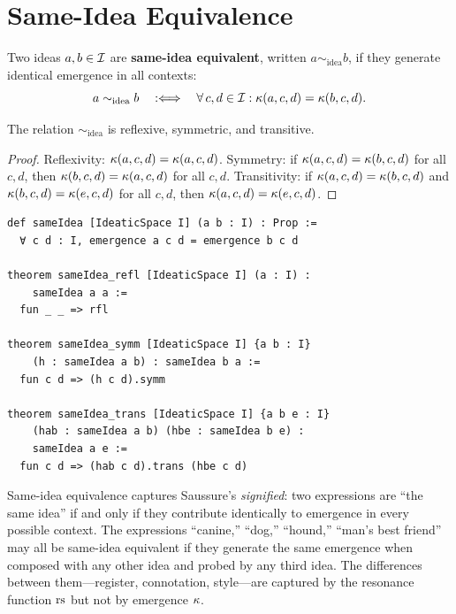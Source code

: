 \section{Same-Idea Equivalence}

\begin{definition}\label{def:same-idea}
Two ideas $a, b \in \mathcal{I}$ are \textbf{same-idea equivalent}, written
$a \sim_{\mathrm{idea}} b$, if they generate identical emergence in all
contexts:
\[
    a \sim_{\mathrm{idea}} b \quad :\Longleftrightarrow \quad
    \forall\, c, d \in \mathcal{I} : \kappa(a, c, d) = \kappa(b, c, d).
\]
\end{definition}

\begin{proposition}
The relation $\sim_{\mathrm{idea}}$ is reflexive, symmetric, and
transitive.
\end{proposition}
\begin{proof}
Reflexivity: $\kappa(a,c,d) = \kappa(a,c,d)$. Symmetry: if
$\kappa(a,c,d) = \kappa(b,c,d)$ for all $c,d$, then
$\kappa(b,c,d) = \kappa(a,c,d)$ for all $c,d$. Transitivity: if
$\kappa(a,c,d) = \kappa(b,c,d)$ and $\kappa(b,c,d) = \kappa(e,c,d)$
for all $c,d$, then $\kappa(a,c,d) = \kappa(e,c,d)$.
\end{proof}

\begin{lstlisting}[language=Lean4, caption={Same-idea equivalence in
Lean 4}]
def sameIdea [IdeaticSpace I] (a b : I) : Prop :=
  ∀ c d : I, emergence a c d = emergence b c d

theorem sameIdea_refl [IdeaticSpace I] (a : I) :
    sameIdea a a :=
  fun _ _ => rfl

theorem sameIdea_symm [IdeaticSpace I] {a b : I}
    (h : sameIdea a b) : sameIdea b a :=
  fun c d => (h c d).symm

theorem sameIdea_trans [IdeaticSpace I] {a b e : I}
    (hab : sameIdea a b) (hbe : sameIdea b e) :
    sameIdea a e :=
  fun c d => (hab c d).trans (hbe c d)
\end{lstlisting}

\begin{interpretation}
Same-idea equivalence captures Saussure's \emph{signified}: two
expressions are ``the same idea'' if and only if they contribute
identically to emergence in every possible context. The expressions
``canine,'' ``dog,'' ``hound,'' ``man's best friend'' may all be
same-idea equivalent if they generate the same emergence when composed
with any other idea and probed by any third idea. The differences between
them---register, connotation, style---are captured by the resonance
function $\mathrm{rs}$ but not by emergence $\kappa$.
\end{interpretation}

